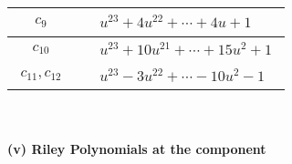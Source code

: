 \documentclass[1p]{elsarticle_modified}
\theoremstyle{definition}
\begin{document}
\begin{tabular}{m{50pt}|m{274pt}}
\hline $$\begin{aligned}c_{9}\end{aligned}$$&$\begin{aligned}
&u^{23}+4 u^{22}+\cdots+4 u+1
\end{aligned}$\\
\hline $$\begin{aligned}c_{10}\end{aligned}$$&$\begin{aligned}
&u^{23}+10 u^{21}+\cdots+15 u^2+1
\end{aligned}$\\
\hline $$\begin{aligned}c_{11},c_{12}\end{aligned}$$&$\begin{aligned}
&u^{23}-3 u^{22}+\cdots-10 u^2-1
\end{aligned}$\\
\hline
\end{tabular}\\~\\
\newpage\renewcommand{\arraystretch}{1}
\flushleft \textbf{(v) Riley Polynomials at the component}\newline \\
\end{document}

